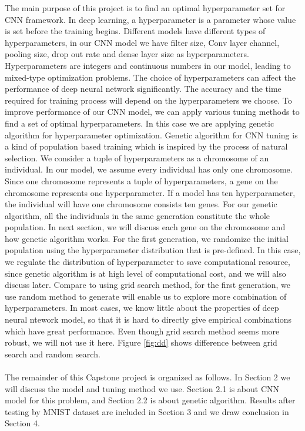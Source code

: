 \documentclass[12pt]{article}
\begin{document}
The main purpose of this project is to find an optimal hyperparameter set for CNN framework. In deep learning, a hyperparameter is a parameter whose value is set before the training begins. Different models have different types of hyperparameters, in our CNN model we have filter size, Conv layer channel, pooling size, drop out rate and dense layer size as hyperparameters. Hyperparameters are integers and continuous numbers in our model, leading to mixed-type optimization problems. The choice of hyperparameters can affect the performance of deep neural network significantly. The accuracy and the time required for training process will depend on the hyperparameters we choose. To improve performance of our CNN model, we can apply various tuning methods to find a set of optimal hyperparameters. In this case we are applying genetic algorithm for hyperparameter optimization. Genetic algorithm for CNN tuning is a kind of population based training which is inspired by the process of natural selection. We consider a tuple of hyperparameters as a chromosome of an individual. In our model, we assume every individual has only one chromosome. Since one chromosome represents a tuple of hyperparameters, a gene on the chromosome represents one hyperparameter. If a model has ten hyperparameter, the individual will have one chromosome consists ten genes. For our genetic algorithm, all the individuals in the same generation constitute the whole population. In next section, we will discuss each gene on the chromosome and how genetic algorithm works. For the first generation, we randomize the initial population using the hyperparameter distribution that is pre-defined. In this case, we regulate the distribution of hyperparameter to save computational resource, since genetic algorithm is at high level of computational cost, and we will also discuss later. Compare to using grid search method, for the first generation, we use random method to generate will enable us to explore more combination of hyperparameters. In most cases, we know little about the properties of deep neural ntework model, so that it is hard to directly give empirical combinations which have great performance. Even though grid search method seems more robust, we will not use it here. Figure \ref{fig:dd} shows difference between grid search and random search.\\
~\\
The remainder of this Capstone project is organized as follows. In Section 2 we will discuss the model and tuning method we use. Section 2.1 is about CNN model for this problem, and Section 2.2 is about genetic algorithm.  Results after testing by MNIST dataset are included in Section 3 and we draw conclusion in Section 4.  \\
\end{document}
